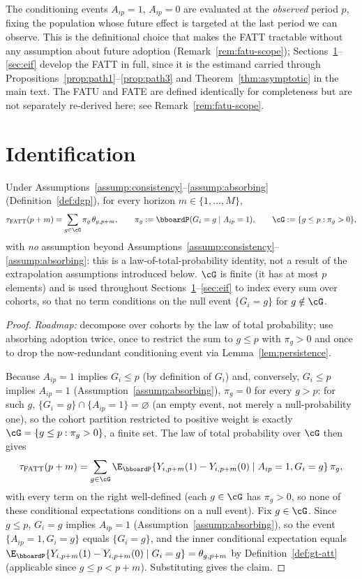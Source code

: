 \documentclass{article}
\renewcommand{\P}{\bboardP}
\begin{document}
The conditioning events $A_{ip}=1$, $A_{ip}=0$ are evaluated at the \emph{observed} period $p$, fixing the population whose future effect is targeted at the last period we can observe. This is the definitional choice that makes the FATT tractable without any assumption about future adoption (Remark~\ref{rem:fatu-scope}); Sections~\ref{sec:identification}--\ref{sec:eif} develop the FATT in full, since it is the estimand carried through Propositions~\ref{prop:path1}--\ref{prop:path3} and Theorem~\ref{thm:asymptotic} in the main text. The FATU and FATE are defined identically for completeness but are not separately re-derived here; see Remark~\ref{rem:fatu-scope}.

\section{Identification}
\label{sec:identification}

\begin{lemma}
\label{lem:aggregation}
Under Assumptions~\ref{assump:consistency}--\ref{assump:absorbing} (Definition~\ref{def:dgp}), for every horizon $m \in \{1,\ldots,M\}$,
\[
\tau_{\mathrm{FATT}}(p+m) = \sum_{g \in \cG} \pi_g\, \theta_{g,p+m}, \qquad \pi_g := \P(G_i = g \mid A_{ip}=1), \qquad \cG := \{g \leq p : \pi_g > 0\},
\]
with \emph{no} assumption beyond Assumptions~\ref{assump:consistency}--\ref{assump:absorbing}: this is a law-of-total-probability identity, not a result of the extrapolation assumptions introduced below. $\cG$ is finite (it has at most $p$ elements) and is used throughout Sections~\ref{sec:identification}--\ref{sec:eif} to index every sum over cohorts, so that no term conditions on the null event $\{G_i=g\}$ for $g\notin\cG$.
\end{lemma}

\begin{proof}
\textit{Roadmap:} decompose over cohorts by the law of total probability; use absorbing adoption twice, once to restrict the sum to $g \leq p$ with $\pi_g>0$ and once to drop the now-redundant conditioning event via Lemma~\ref{lem:persistence}.

Because $A_{ip}=1$ implies $G_i \leq p$ (by definition of $G_i$) and, conversely, $G_i\le p$ implies $A_{ip}=1$ (Assumption~\ref{assump:absorbing}), $\pi_g = 0$ for every $g > p$: for such $g$, $\{G_i=g\}\cap\{A_{ip}=1\}=\varnothing$ (an empty event, not merely a null-probability one), so the cohort partition restricted to positive weight is exactly $\cG=\{g\leq p:\pi_g>0\}$, a finite set. The law of total probability over $\cG$ then gives
\[
\tau_{\mathrm{FATT}}(p+m) = \sum_{g \in \cG} \E_{\P}\{Y_{i,p+m}(1) - Y_{i,p+m}(0) \mid A_{ip}=1, G_i=g\}\, \pi_g,
\]
with every term on the right well-defined (each $g\in\cG$ has $\pi_g>0$, so none of these conditional expectations conditions on a null event). Fix $g \in \cG$. Since $g \leq p$, $G_i = g$ implies $A_{ip}=1$ (Assumption~\ref{assump:absorbing}), so the event $\{A_{ip}=1, G_i=g\}$ equals $\{G_i=g\}$, and the inner conditional expectation equals $\E_{\P}\{Y_{i,p+m}(1) - Y_{i,p+m}(0) \mid G_i=g\} = \theta_{g,p+m}$ by Definition~\ref{def:gt-att} (applicable since $g \leq p < p+m$). Substituting gives the claim.
\end{proof}
\end{document}
